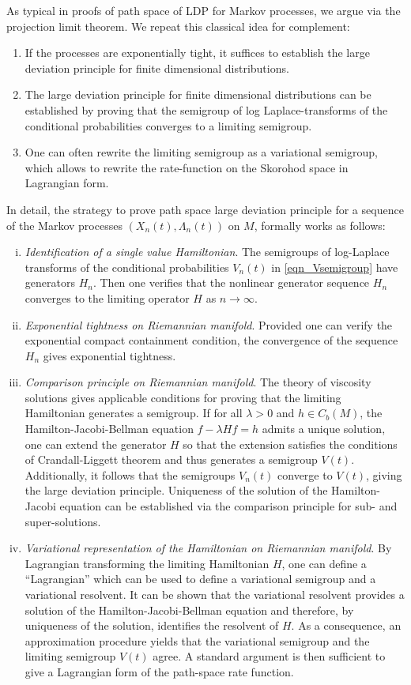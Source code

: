 \documentclass[a4paper]{article}
\numberwithin{equation}{section}
\theoremstyle{definition}
\begin{document}
As typical in proofs of path space of LDP for Markov processes, we argue via the projection limit theorem. We repeat this classical idea for complement:
\begin{enumerate}[(1)]
    \item 
    If the processes are exponentially tight, it suffices to establish the large deviation principle for finite dimensional distributions. 
    \item The large deviation principle for finite dimensional distributions can be established by proving that the semigroup of log Laplace-transforms of the conditional probabilities converges to a limiting semigroup.
    \item One can often rewrite the limiting semigroup as a variational semigroup, which allows to rewrite the rate-function on the Skorohod space in Lagrangian form.
\end{enumerate}
In detail, the strategy to prove path space large deviation principle for a sequence of the Markov processes $(X_n(t),\Lambda_n(t))$ on $M$, formally works as follows:
\begin{enumerate}[(i)]
    \item \textit{Identification of a single value Hamiltonian}. The semigroups of log-Laplace transforms of the conditional probabilities $V_n(t)$ in \eqref{eqn_Vsemigroup} have generators $H_n$. Then one verifies that the nonlinear generator sequence $H_n$ converges to the limiting operator $H$ as $n\to \infty$.
    \item \textit{Exponential tightness on Riemannian manifold}. Provided one can verify the exponential compact containment condition, the convergence of the sequence $H_n$ gives exponential tightness.
    \item \textit{Comparison principle on Riemannian manifold}. The theory of viscosity solutions gives applicable conditions for proving that the limiting Hamiltonian generates a semigroup. If for all $\lambda> 0$ and $h\in C_b(M)$, the Hamilton-Jacobi-Bellman equation $f-\lambda Hf = h$ admits a unique solution, one can extend the generator $H$ so that the extension satisﬁes the conditions of Crandall-Liggett theorem \cite{CL1971} and thus generates a semigroup $V(t)$. Additionally, it follows that the semigroups $V_n(t)$ converge to $V(t)$, giving the large deviation principle. Uniqueness of the solution of the Hamilton-Jacobi equation can be established via the comparison principle for sub- and super-solutions.
    \item \textit{Variational representation of the Hamiltonian on Riemannian manifold}. By Lagrangian transforming the limiting Hamiltonian $H$, one can define a “Lagrangian” which can be used to define a variational semigroup and a variational resolvent. It can be shown that the variational resolvent provides a solution of the Hamilton-Jacobi-Bellman equation and therefore, by uniqueness of the solution, identiﬁes the resolvent of $H$. As a consequence, an approximation procedure yields that the variational semigroup and the limiting semigroup $V(t)$ agree. A standard argument is then sufficient to give a Lagrangian form of the path-space rate function. 
\end{enumerate}
\end{document}
